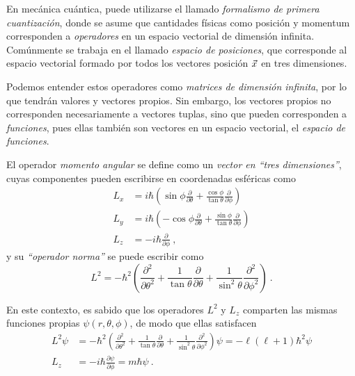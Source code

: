 \begin{ejemplo}
    En mecánica cuántica, puede utilizarse el llamado \emph{formalismo de primera cuantización}, donde se asume que cantidades físicas como posición y momentum corresponden a \emph{operadores} en un espacio vectorial de dimensión infinita. Comúnmente se trabaja en el llamado \emph{espacio de posiciones}, que corresponde al espacio vectorial formado por todos los vectores posición $\vec{x}$ en tres dimensiones.
    
    Podemos entender estos operadores como \emph{matrices de dimensión infinita}, por lo que tendrán valores y vectores propios. Sin embargo, los vectores propios no corresponden necesariamente a vectores tuplas, sino que pueden corresponden a \emph{funciones}, pues ellas también son vectores en un espacio vectorial, el \emph{espacio de funciones}.

    El operador \emph{momento angular} se define como un \emph{vector en ``tres dimensiones''}, cuyas componentes pueden escribirse en coordenadas esféricas como
    \begin{align*}
        L_x & = i\hbar \left( \sin \phi \frac{\partial}{\partial \theta} + \frac{\cos \phi}{\tan \theta} \frac{\partial}{\partial \phi} \right) \\
        L_y & = i\hbar \left( -\cos \phi \frac{\partial}{\partial \theta} + \frac{\sin \phi}{\tan \theta} \frac{\partial}{\partial \phi} \right) \\
        L_z & = -i \hbar \frac{\partial}{\partial \phi} \ ,
    \end{align*}
    y su \emph{``operador norma''} se puede escribir como
    \begin{equation*}
        L^2 = -\hbar^2 \left( \frac{\partial^2}{\partial \theta^2} + \frac{1}{\tan \theta} \frac{\partial}{\partial \theta} + \frac{1}{\sin^2  \theta} \frac{\partial^2}{\partial \phi^2} \right) \ .
    \end{equation*}

    En este contexto, es sabido que los operadores $L^2$ y $L_z$ comparten las mismas funciones propias $\psi(r, \theta, \phi)$, de modo que ellas satisfacen 
    \begin{align*}
        L^2 \psi & = -\hbar^2 \left( \frac{\partial^2}{\partial \theta^2} + \frac{1}{\tan \theta} \frac{\partial}{\partial \theta} + \frac{1}{\sin^2  \theta} \frac{\partial^2}{\partial \phi^2} \right) \psi = - \ell(\ell+1) \hbar^2 \psi \\
        L_z & = -i\hbar \frac{\partial \psi}{\partial \phi} = m \hbar \psi \ .
    \end{align*}


\end{ejemplo}
